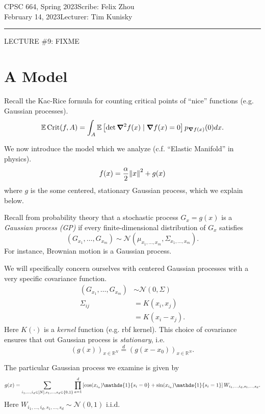 \documentclass[12pt]{article}
\newcommand\coursename{CPSC 664, Spring 2023}
\newcommand\scribe{Felix Zhou}
\newcommand\lecturer{Tim Kunisky}
\newcommand\lecturedate{February 14, 2023}
\newcommand\lecturetitle{LECTURE \#9: FIXME}
\DeclarePairedDelimiter{\set}{\lbrace}{\rbrace}
\DeclareMathOperator{\Crit}{Crit}
\newcommand{\R}{\mathbb{R}}
\newcommand{\E}{\mathbb{E}}
\newcommand{\mcal}{\mathcal}
\newcommand{\ones}{\mathds{1}}
\newcommand{\eq}[1]{\stackrel{#1}{=}}
\begin{document}
\noindent \coursename \hfill Scribe: \scribe \\
\lecturedate \hfill Lecturer: \lecturer
\vspace{1em}

\hrule

\vspace{1.5em}
\begin{center}
  {\Large\lecturetitle}
\end{center}

\section{A Model}
Recall the Kac-Rice formula for counting critical points of ``nice'' functions (e.g. Gaussian processes).
\[
  \E \Crit(f, A)
  = \int_A \E\left[ \det \grad^2 f(x)\mid \grad f(x)=0 \right] p_{\grad f(x)}(0) dx.
\]

We now introduce the model which we analyze (c.f. ``Elastic Manifold'' in physics).
\[
  f(x) = \frac\alpha2 \norm{x}^2 + g(x)
\]
where $g$ is the some centered, stationary Gaussian process,
which we explain below.

Recall from probability theory that a stochastic process $G_x = g(x)$ is a \emph{Gaussian process (GP)}
if every finite-dimensional distribution of $G_x$ satisfies
\[
  (G_{x_1}, \dots, G_{x_m}) \sim \mcal N(\mu_{x_1, \dots, x_m}, \Sigma_{x_1, \dots, x_m}).
\]
For instance,
Brownian motion is a Gaussian process.

We will specifically concern ourselves with centered Gaussian processes
with a very specific covariance function.
\begin{align*}
  (G_{x_1}, \dots, G_{x_m}) &\sim \mcal N(0, \Sigma) \\
  \Sigma_{ij} &= K(x_i, x_j) \\
  &= K(x_i-x_j).
\end{align*}
Here $K(\cdot)$ is a \emph{kernel} function (e.g. rbf kernel).
This choice of covariance ensures that out Gaussian process is \emph{stationary},
i.e.
\[
  (g(x))_{x\in \R^N} \eq{d} (g(x-x_0))_{x\in \R^N}.
\]

The particular Gaussian process we examine is given by
\[
  g(x)
  = \sum_{i_1, \dots, i_d\in [N], s_1, \dots, s_d\in \set{0, 1}}
  \prod_{a=1}^d \left[ \cos(x_{i_a})\ones\set{s_i=0} + \sin(x_{i_a})\ones\set{s_i=1} \right]
  W_{i_1, \dots, i_d, s_1, \dots, s_d}.
\]
Here $W_{i_1, \dots, i_d, s_1, \dots, s_d}\sim \mcal N(0, 1)$ i.i.d.
\end{document}
